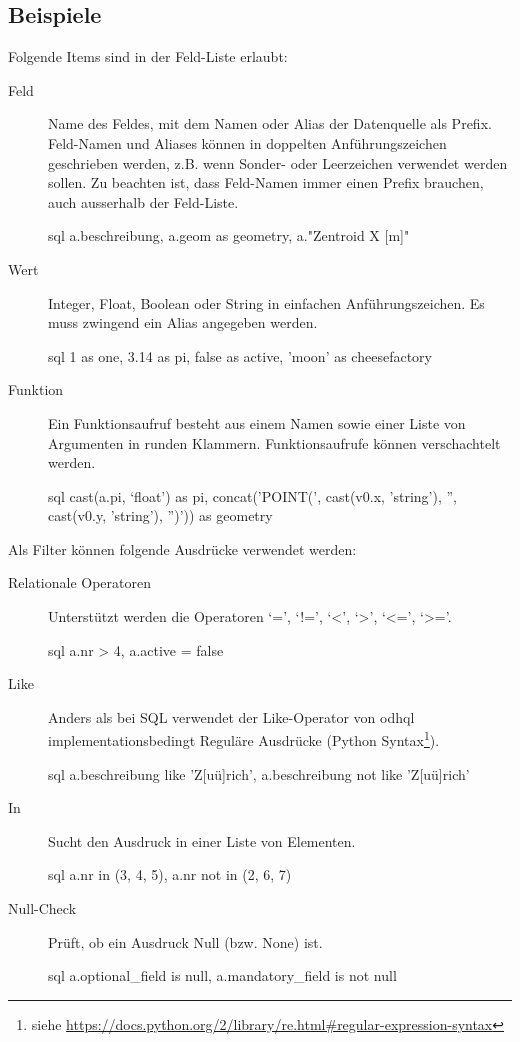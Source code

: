 \subsection{Beispiele}
Folgende Items sind in der Feld-Liste erlaubt:
\begin{description}
\item[Feld] Name des Feldes, mit dem Namen oder Alias der Datenquelle als Prefix. Feld-Namen und Aliases können in doppelten Anführungszeichen geschrieben werden, z.B. wenn Sonder- oder Leerzeichen verwendet werden sollen. Zu beachten ist, dass Feld-Namen immer einen Prefix brauchen, auch ausserhalb der Feld-Liste.
\begin{src}{sql}
a.beschreibung, a.geom as geometry, a."Zentroid X [m]"
\end{src}
\item[Wert] Integer, Float, Boolean oder String in einfachen Anführungszeichen. Es muss zwingend ein Alias angegeben werden. 
\begin{src}{sql}
1 as one, 3.14 as pi, false as active, 'moon' as cheesefactory
\end{src}
\item[Funktion] Ein Funktionsaufruf besteht aus einem Namen sowie einer Liste von Argumenten in runden Klammern. Funktionsaufrufe können verschachtelt werden.
\begin{src}{sql}
 cast(a.pi, `float') as pi,
 concat('POINT(', cast(v0.x, 'string'), '', cast(v0.y, 'string'), '')')) as geometry
\end{src}
\end{description}

Als Filter können folgende Ausdrücke verwendet werden:
\begin{description}
\item[Relationale Operatoren] Unterstützt werden die Operatoren `=', `!=', `<', `>', `<=', `>='.
\begin{src}{sql}
a.nr > 4, a.active = false
\end{src}
\item[Like] Anders als bei SQL verwendet der Like-Operator von \acs{odhql} implementationsbedingt Reguläre Ausdrücke (Python Syntax\footnote{siehe \url{https://docs.python.org/2/library/re.html\#regular-expression-syntax}}).
\begin{src}{sql}
a.beschreibung like 'Z[uü]rich', a.beschreibung not like 'Z[uü]rich'
\end{src}
\item[In] Sucht den Ausdruck in einer Liste von Elementen.
\begin{src}{sql}
a.nr in (3, 4, 5), a.nr not in (2, 6, 7)
\end{src}
\item[Null-Check] Prüft, ob ein Ausdruck Null (bzw. None) ist.
\begin{src}{sql}
a.optional_field is null, a.mandatory_field is not null
\end{src}
\end{description}

